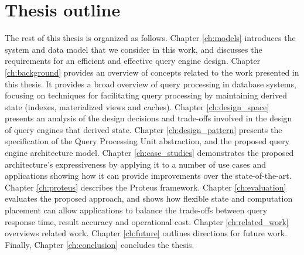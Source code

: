 \section{Thesis outline}

The rest of this thesis is organized as follows.
Chapter \ref{ch:models} introduces the system and data model that we consider in this work,
and discusses the requirements for an efficient and effective query engine design.
Chapter \ref{ch:background} provides an overview of concepts related to the work presented in this thesis.
It provides a broad overview of query processing in database systems,
focusing on techniques for facilitating query processing by maintaining derived state (indexes, materialized views and caches).
Chapter \ref{ch:design_space} presents an analysis of the design decisions and trade-offs involved in the design
of query engines that derived state.
Chapter \ref{ch:design_pattern} presents the specification of the Query Processing Unit abstraction,
and the proposed query engine architecture model.
Chapter \ref{ch:case_studies} demonstrates the proposed architecture's expressiveness by applying it to a number
of use cases and applications showing how it can provide improvements over the state-of-the-art.
Chapter \ref{ch:proteus} describes the Proteus framework.
Chapter \ref{ch:evaluation} evaluates the proposed approach,
and shows how flexible state and computation placement can allow applications to balance the trade-offs between
query response time, result accuracy and operational cost.
Chapter \ref{ch:related_work} overviews related work.
Chapter \ref{ch:future} outlines directions for future work.
Finally, Chapter \ref{ch:conclusion} concludes the thesis.

